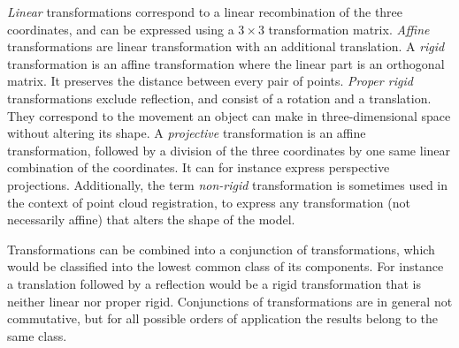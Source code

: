 \emph{Linear} transformations correspond to a linear recombination of the three coordinates, and can be expressed using a $3 \times 3$ transformation matrix. \emph{Affine} transformations are linear transformation with an additional translation. A \emph{rigid} transformation is an affine transformation where the linear part is an orthogonal matrix. It preserves the distance between every pair of points. \emph{Proper rigid} transformations exclude reflection, and consist of a rotation and a translation. They correspond to the movement an object can make in three-dimensional space without altering its shape. A \emph{projective} transformation is an affine transformation, followed by a division of the three coordinates by one same linear combination of the coordinates. It can for instance express perspective projections. Additionally, the term \emph{non-rigid} transformation is sometimes used in the context of point cloud registration, to express any transformation (not necessarily affine) that alters the shape of the model.

Transformations can be combined into a conjunction of transformations, which would be classified into the lowest common class of its components. For instance a translation followed by a reflection would be a rigid transformation that is neither linear nor proper rigid. Conjunctions of transformations are in general not commutative, but for all possible orders of application the results belong to the same class.

